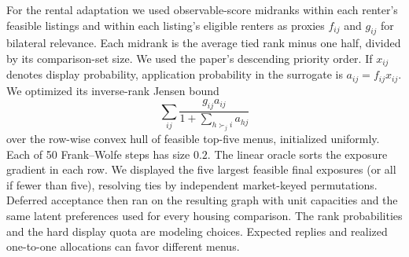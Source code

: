 For the rental adaptation we used observable-score midranks within each renter's feasible listings and within each listing's eligible renters as proxies $f_{ij}$ and $g_{ij}$ for bilateral relevance. Each midrank is the average tied rank minus one half, divided by its comparison-set size. We used the paper's descending priority order. If $x_{ij}$ denotes display probability, application probability in the surrogate is $a_{ij}=f_{ij}x_{ij}$. We optimized its inverse-rank Jensen bound
\[
  \sum_{ij} \frac{g_{ij}a_{ij}}{1+\sum_{h\succ_j i}a_{hj}}
\]
over the row-wise convex hull of feasible top-five menus, initialized uniformly. Each of 50 Frank--Wolfe steps has size $0.2$. The linear oracle sorts the exposure gradient in each row. We displayed the five largest feasible final exposures (or all if fewer than five), resolving ties by independent market-keyed permutations. Deferred acceptance then ran on the resulting graph with unit capacities and the same latent preferences used for every housing comparison. The rank probabilities and the hard display quota are modeling choices. Expected replies and realized one-to-one allocations can favor different menus.
